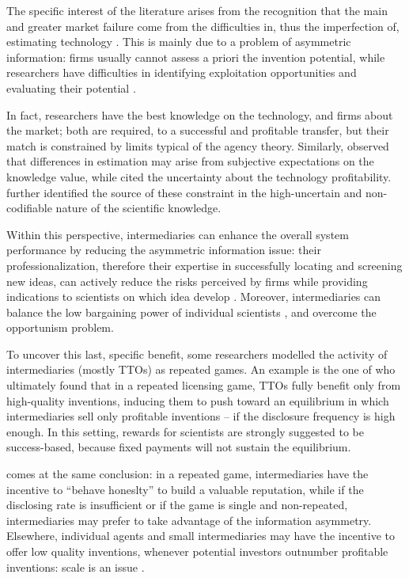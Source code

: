 The specific interest of the literature arises from the recognition that the main and greater market failure come from the difficulties in, thus the imperfection of, estimating technology \citep{Hoppe2005}. This is mainly due to a problem of asymmetric information: firms usually cannot assess a priori the invention potential, while researchers have difficulties in identifying exploitation opportunities and evaluating their potential \citep{Debackere2005}. 

In fact, researchers have the best knowledge on the technology, and firms about the market; both are required, to a successful and profitable transfer, but their match is constrained by limits typical of the agency theory. Similarly, \citet{Bercovitz2006} observed that differences in estimation may arise from subjective expectations on the knowledge value, while \citet{Hoppe2005} cited the uncertainty about the technology profitability. \citet{Debackere2005} further identified the source of these constraint in the high-uncertain and non-codifiable nature of the scientific knowledge.

Within this perspective, intermediaries can enhance the overall system performance by reducing the asymmetric information issue: their professionalization, therefore their expertise in successfully locating and screening new ideas, can actively reduce the risks perceived by firms while providing indications to scientists on which idea develop \citep{Debackere2005}. Moreover, intermediaries can balance the low bargaining power of individual scientists \citep{Bercovitz2006}, and overcome the opportunism problem.

To uncover this last, specific benefit, some researchers modelled the activity of intermediaries (mostly TTOs) as repeated games. An example is the one of \citet{Hoppe2005} who ultimately found that in a repeated licensing game, TTOs fully benefit only from high-quality inventions, inducing them to push toward an equilibrium in which intermediaries sell only profitable inventions – if the disclosure frequency is high enough. In this setting, rewards for scientists are strongly suggested to be success-based, because fixed payments will not sustain the equilibrium. 

\citet{Macho-Stadler2007} comes at the same conclusion: in a repeated game, intermediaries have the incentive to \enquote{behave honeslty} to build a valuable reputation, while if the disclosing rate is insufficient or if the game is single and non-repeated, intermediaries may prefer to take advantage of the information asymmetry. Elsewhere, individual agents and small intermediaries may have the incentive to offer low quality inventions, whenever potential investors outnumber profitable inventions: scale is an issue \citep{Hoppe2005, Macho-Stadler2007}. 

